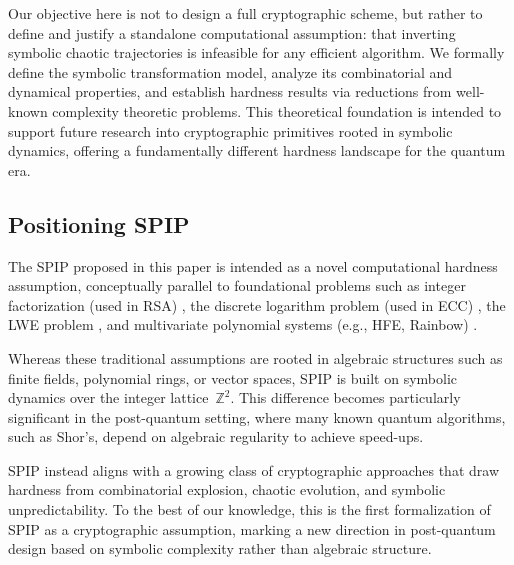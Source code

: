 \documentclass[twocolumn,10pt]{article}
\begin{document}
Our objective here is not to design a full cryptographic scheme, but rather to define and justify a standalone computational assumption: that inverting symbolic chaotic trajectories is infeasible for any efficient algorithm. We formally define the symbolic transformation model, analyze its combinatorial and dynamical properties, and establish hardness results via reductions from well-known complexity theoretic problems. This theoretical foundation is intended to support future research into cryptographic primitives rooted in symbolic dynamics, offering a fundamentally different hardness landscape for the quantum era.



\subsection{Positioning SPIP}

The SPIP proposed in this paper is intended as a novel computational hardness assumption, conceptually parallel to foundational problems such as integer factorization (used in RSA) \cite{rivest1984rsa}, the discrete logarithm problem (used in ECC) \cite{merkle1978secure}, the LWE problem \cite{regev2009lattices,lyubashevsky2010ideal}, and multivariate polynomial systems (e.g., HFE, Rainbow) \cite{li1997numerical,ding2005rainbow}.

Whereas these traditional assumptions are rooted in algebraic structures such as finite fields, polynomial rings, or vector spaces, SPIP is built on symbolic dynamics over the integer lattice~$\mathbb{Z}^2$. This difference becomes particularly significant in the post-quantum setting, where many known quantum algorithms, such as Shor’s, depend on algebraic regularity to achieve speed-ups.

SPIP instead aligns with a growing class of cryptographic approaches that draw hardness from combinatorial explosion, chaotic evolution, and symbolic unpredictability. To the best of our knowledge, this is the first formalization of SPIP as a cryptographic assumption, marking a new direction in post-quantum design based on symbolic complexity rather than algebraic structure.
\end{document}
